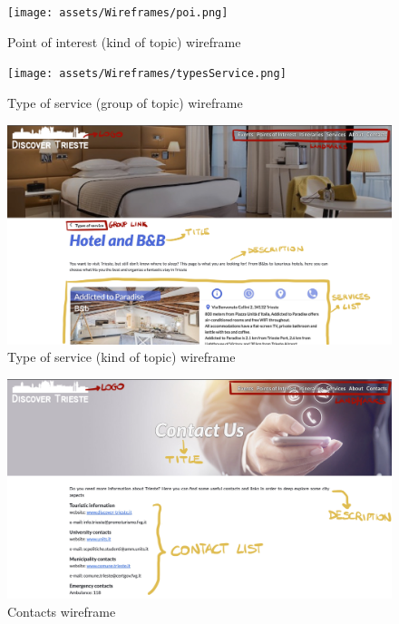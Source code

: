 \documentclass[table, 12pt]{article}
\begin{document}
\begin{figure}[H]
    \begin{center}
        \texttt{[image: assets/Wireframes/poi.png]}
        \caption{Point of interest (kind of topic) wireframe}
    \end{center}
\end{figure}

\begin{figure}[H]
    \begin{center}
        \texttt{[image: assets/Wireframes/typesService.png]}
        \caption{Type of service (group of topic) wireframe}
    \end{center}
\end{figure}

\begin{figure}[H]
    \begin{center}
        \includegraphics[width=\textwidth]{assets/Wireframes/service.png}
        \caption{Type of service (kind of topic) wireframe}
    \end{center}
\end{figure}

\begin{figure}[H]
    \begin{center}
        \includegraphics[width=\textwidth]{assets/Wireframes/contacts.png}
        \caption{Contacts wireframe}
    \end{center}
\end{figure}
\end{document}
